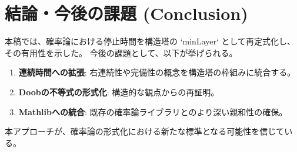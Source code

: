 \documentclass[11pt, a4paper]{article}
\begin{document}
\section{結論・今後の課題 (Conclusion)}

本稿では、確率論における停止時間を構造塔の `minLayer` として再定式化し、その有用性を示した。
今後の課題として、以下が挙げられる。
\begin{enumerate}
    \item \textbf{連続時間への拡張}: 右連続性や完備性の概念を構造塔の枠組みに統合する。
    \item \textbf{Doobの不等式の形式化}: 構造的な観点からの再証明。
    \item \textbf{Mathlibへの統合}: 既存の確率論ライブラリとのより深い親和性の確保。
\end{enumerate}

本アプローチが、確率論の形式化における新たな標準となる可能性を信じている。
\end{document}
